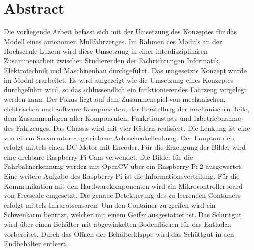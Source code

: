 \section*{Abstract}
Die vorliegende Arbeit befasst sich mit der Umsetzung des Konzeptes für das Modell eines autonomen Müllfahrzeuges. Im Rahmen des Moduls \grqq an der Hochschule Luzern wird diese Umsetzung in einer interdisziplinären Zusammenarbeit zwischen Studierenden der Fachrichtungen Informatik, Elektrotechnik und Maschinenbau durchgeführt. Das umgesetzte Konzept wurde im Modul \grqq erarbeitet. Es wird aufgezeigt wie die Umsetzung eines Konzeptes durchgeführt wird, so das schlussendlich ein funktionierendes Fahrzeug vorgelegt werden kann. Der Fokus liegt auf dem Zusammenspiel von mechanischen, elektrischen und Software-Komponenten, der Herstellung der mechanischen Teile, dem Zusammenfügen aller Komponenten, Funkrtionstests und Inbetriebnahme des Fahrzeuges. Das Chassis wird mit vier Rädern realisiert. Die Lenkung ist eine von einem Servomotor angetriebene Achsschenkellenkung. Der Hauptantrieb erfolgt mittels einen DC-Motor mit Encoder. Für die Erzeugung der Bilder wird eine drehbare Raspberry Pi Cam verwendet. Die Bilder für die Fahrbahnerkennung werden mit OpenCV über ein Raspberry Pi 2 ausgewertet. Eine weitere Aufgabe des Raspberry Pi ist die Informationsverteilung. Für die Kommunikation mit den Hardwarekomponenten wird ein Mikrocontrollerboard von Freescale eingesetzt. Die genaue Detektierung des zu leerenden Containers erfolgt mittels Infrarotsensoren. Um den Container zu greifen wird ein Schwenkarm benutzt, welcher mit einem Geifer ausgestattet ist. Das Schüttgut wird über einen Behälter mit abgewinkelten Bodenflächen für das Entladen vorbereitet. Durch das Öffnen der Behälterklappe wird das Schüttgut in den Endbehälter entleert.
\clearpage